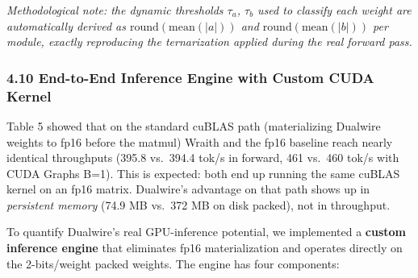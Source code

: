 \emph{Methodological note: the dynamic thresholds \(\tau_a\), \(\tau_b\)
used to classify each weight are automatically derived as
\(\text{round}(\text{mean}(|a|))\) and
\(\text{round}(\text{mean}(|b|))\) per module, exactly reproducing the
ternarization applied during the real forward pass.}

\subsubsection{4.10 End-to-End Inference Engine with Custom CUDA
Kernel}\label{end-to-end-inference-engine-with-custom-cuda-kernel}

Table 5 showed that on the standard cuBLAS path (materializing Dualwire
weights to fp16 before the matmul) Wraith and the fp16 baseline reach
nearly identical throughputs (395.8 vs.~394.4 tok/s in forward, 461
vs.~460 tok/s with CUDA Graphs B=1). This is expected: both end up
running the same cuBLAS kernel on an fp16 matrix. Dualwire's advantage
on that path shows up in \emph{persistent memory} (74.9 MB vs.~372 MB on
disk packed), not in throughput.

To quantify Dualwire's real GPU-inference potential, we implemented a
\textbf{custom inference engine} that eliminates fp16 materialization
and operates directly on the 2-bits/weight packed weights. The engine
has four components:

